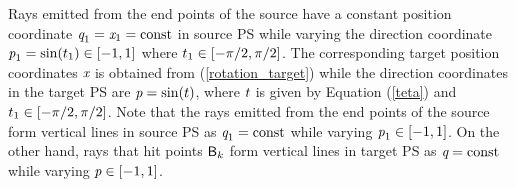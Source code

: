 Rays emitted from the end points of the source have a constant position coordinate $\textit{q}_1 = \textit{x}_1 = \textrm{const}$ in source PS while varying the direction coordinate $\textit{p}_1 = \sin(t_1)\in[-1, 1]$ where $t_1\in[-\pi/2, \pi/2]$. The corresponding target position coordinates $\textit{x}$ is obtained from (\ref{rotation_target}) while the direction coordinates in the target PS are $\textit{p} = \sin(t)$, where $t$ is given by Equation (\ref{teta}) and $t_1\in[-\pi/2, \pi/2]$.
Note that the rays emitted from the end points of the source form vertical lines in source PS as $\textit{q}_1= \textrm{const}$ while varying $\textit{p}_1\in[-1,1]$.
On the other hand, rays that hit points $\textsf{B}_k$ form vertical lines in target PS as $\textit{q} = \textrm{const}$ while varying $\textit{p}\in[-1,1]$.
\\ \indent 
%
